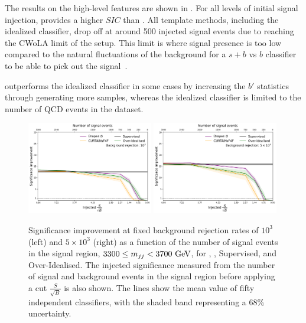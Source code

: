 The results on the high-level features are shown in .
For all levels of initial signal injection, \drapes provides a higher $SIC$ than \FfF.
All template methods, including the idealized classifier, drop off at around 500 injected signal events due to reaching the CWoLA limit of the setup.
This limit is where signal presence is too low compared to the natural fluctuations of the background for a $s+b$ vs $b$ classifier to be able to pick out the signal~\cite{AachenLimit}.

\drapes outperforms the idealized classifier in some cases by increasing the $b'$ statistics through generating more samples, whereas the idealized classifier is limited to the number of QCD events in the dataset.

\begin{figure}[hbpt]
    \centering
    \includegraphics[width=0.49\textwidth]{Figures/jet_generation/drapes/og_compare_rej_1000_sic_vs_nsig.pdf}
    \includegraphics[width=0.49\textwidth]{Figures/jet_generation/drapes/og_compare_rej_5000_sic_vs_nsig.pdf}
    \caption{Significance improvement at fixed background rejection rates of $10^3$ (left) and \mbox{$5 \times 10^3$} (right) as a function of the number of signal events in the signal region, \mbox{$3300\leq m_{jj}<3700~\GeV$}, for \drapes, \FfF, Supervised, and Over-Idealised.
        The injected significance measured from the number of signal and background events in the signal region before applying a cut $\frac{S}{\sqrt{B}}$ is also shown.
        The lines show the mean value of fifty independent classifiers, with the shaded band representing a 68\% uncertainty.
    }
    \label{fig:drapes_hlv}
\end{figure}

